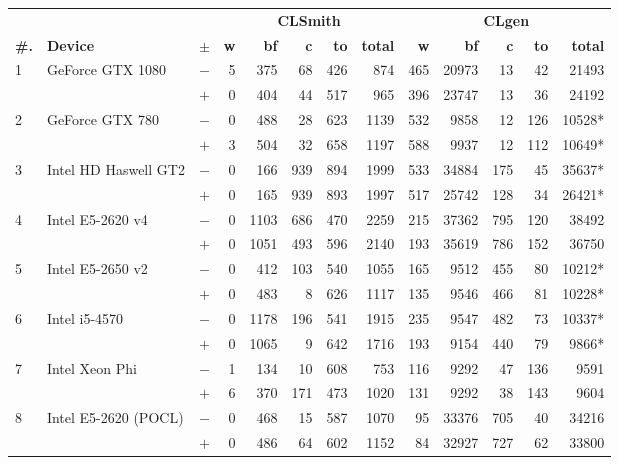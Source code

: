   \begin{tabular}{lll | rrrrr | rrrrr }
  \toprule
  & & & \multicolumn{5}{c|}{\textbf{CLSmith}} & \multicolumn{5}{c}{\textbf{CLgen}} \\
  \textbf{\#.} & \textbf{Device} & $\pm$ &
  \textbf{w} & \textbf{bf} & \textbf{c} & \textbf{to} & \textbf{total} &
  \textbf{w} & \textbf{bf} & \textbf{c} & \textbf{to} & \textbf{total} \\
  \midrule
  \multirow{ 2}{*}{1} & \multirow{ 2}{*}{GeForce GTX 1080} & $-$ & 5 & 375 & 68 & 426 & 874       & 465 & 20973 & 13 & 42 & 21493 \\& & $+$ & 0 & 404 & 44 & 517 & 965 & 396 & 23747 & 13 & 36 & 24192 \\
\hline
\multirow{ 2}{*}{2} & \multirow{ 2}{*}{GeForce GTX 780} & $-$ & 0 & 488 & 28 & 623 & 1139       & 532 & 9858 & 12 & 126 & 10528* \\& & $+$ & 3 & 504 & 32 & 658 & 1197 & 588 & 9937 & 12 & 112 & 10649* \\
\hline
\multirow{ 2}{*}{3} & \multirow{ 2}{*}{Intel HD Haswell GT2} & $-$ & 0 & 166 & 939 & 894 & 1999       & 533 & 34884 & 175 & 45 & 35637* \\& & $+$ & 0 & 165 & 939 & 893 & 1997 & 517 & 25742 & 128 & 34 & 26421* \\
\hline
\multirow{ 2}{*}{4} & \multirow{ 2}{*}{Intel E5-2620 v4} & $-$ & 0 & 1103 & 686 & 470 & 2259       & 215 & 37362 & 795 & 120 & 38492 \\& & $+$ & 0 & 1051 & 493 & 596 & 2140 & 193 & 35619 & 786 & 152 & 36750 \\
\hline
\multirow{ 2}{*}{5} & \multirow{ 2}{*}{Intel E5-2650 v2} & $-$ & 0 & 412 & 103 & 540 & 1055       & 165 & 9512 & 455 & 80 & 10212* \\& & $+$ & 0 & 483 & 8 & 626 & 1117 & 135 & 9546 & 466 & 81 & 10228* \\
\hline
\multirow{ 2}{*}{6} & \multirow{ 2}{*}{Intel i5-4570} & $-$ & 0 & 1178 & 196 & 541 & 1915       & 235 & 9547 & 482 & 73 & 10337* \\& & $+$ & 0 & 1065 & 9 & 642 & 1716 & 193 & 9154 & 440 & 79 & 9866* \\
\hline
\multirow{ 2}{*}{7} & \multirow{ 2}{*}{Intel Xeon Phi} & $-$ & 1 & 134 & 10 & 608 & 753       & 116 & 9292 & 47 & 136 & 9591 \\& & $+$ & 6 & 370 & 171 & 473 & 1020 & 131 & 9292 & 38 & 143 & 9604 \\
\hline
\multirow{ 2}{*}{8} & \multirow{ 2}{*}{Intel E5-2620 (POCL)} & $-$ & 0 & 468 & 15 & 587 & 1070       & 95 & 33376 & 705 & 40 & 34216 \\& & $+$ & 0 & 486 & 64 & 602 & 1152 & 84 & 32927 & 727 & 62 & 33800 \\

\end{tabular}
